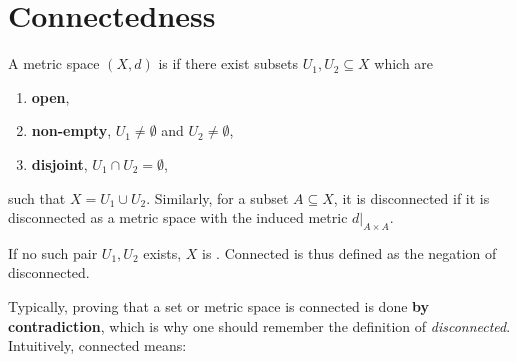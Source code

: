 
\section{Connectedness}
\label{sec:connectedness}

\begin{definition}
\label{def:connectedness}
A metric space $(X,d)$ is   if there
exist subsets $U_1, U_2 \subseteq X$ which are
\begin{enumerate}[label=\textbf{(\alph*)}]
  \item \textbf{open},
  \item \textbf{non-empty}, $U_1 \neq \emptyset$ and $U_2 \neq \emptyset$,
  \item \textbf{disjoint}, $U_1 \cap U_2 = \emptyset$,
\end{enumerate}
such that $X = U_1 \cup U_2$. Similarly, for a subset $A \subseteq X$, it is disconnected if it is
disconnected as a metric space with the induced metric $d|_{A \times A}$.

If no such pair $U_1, U_2$ exists, $X$ is 
. Connected is thus defined as the negation of disconnected.
\end{definition}

Typically, proving that a set or metric space is connected is done \textbf{by contradiction},
which is why one should remember the definition of \textit{disconnected}. Intuitively, connected
means: 

